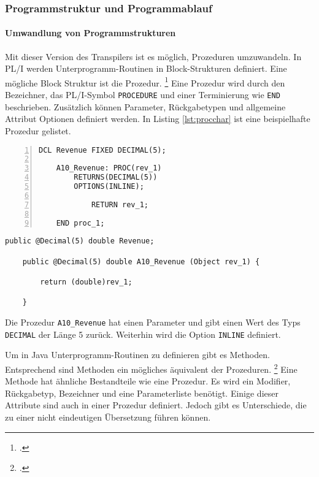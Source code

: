 \pagebreak
\subsubsection{Programmstruktur und Programmablauf}
\paragraph{Umwandlung von Programmstrukturen }\label{programstruct}

Mit dieser Version des Transpilers ist es möglich, Prozeduren umzuwandeln.
In PL/I werden Unterprogramm-Routinen in Block-Strukturen definiert. Eine mögliche Block Struktur ist die Prozedur. \footcite[Vgl. ][S. 97ff. ]{pliref}
Eine Prozedur wird durch den Bezeichner, das PL/I-Symbol \verb+PROCEDURE+ und einer Terminierung wie \verb+END+ beschrieben.
Zusätzlich können Parameter, Rückgabetypen und allgemeine Attribut Optionen definiert werden. In Listing \ref{lst:procchar} ist eine beispielhafte Prozedur gelistet.

\begin{minipage}[b]{0.48\linewidth}
	\centering
	\lstset{language=PL/I,label=SliceExaple}
	\begin{lstlisting}[frame=single, numbers=left, mathescape,%
		caption={Prozeduren}, label={lst:procchar}]
	DCL Revenue FIXED DECIMAL(5);

	A10_Revenue: PROC(rev_1) 
		RETURNS(DECIMAL(5)) 
		OPTIONS(INLINE);
			
			RETURN rev_1;
	
	END proc_1;
	\end{lstlisting}
\end{minipage}
\hspace{0.5cm}
\begin{minipage}[b]{0.48\linewidth}
	\centering
	\lstset{language=Java,label=SliceExaple}
	\begin{lstlisting}[frame=single, mathescape,%
		title={" "}]
	public @Decimal(5) double Revenue;
		
	public @Decimal(5) double A10_Revenue (Object rev_1) { 
		
		return (double)rev_1;
	
	}
	\end{lstlisting}
\end{minipage}

Die Prozedur \verb+A10_Revenue+ hat einen Parameter und gibt einen Wert des Typs \verb+DECIMAL+ der L\"ange 5 zur\"uck.
Weiterhin wird die Option \verb+INLINE+ definiert.

Um in Java Unterprogramm-Routinen zu definieren gibt es Methoden. 
Entsprechend sind Methoden ein mögliches äquivalent der Prozeduren. \footcite[Vgl. ][]{oracle}
Eine Methode hat ähnliche Bestandteile wie eine Prozedur.
Es wird ein Modifier, Rückgabetyp, Bezeichner und eine Parameterliste benötigt.
Einige dieser Attribute sind auch in einer Prozedur definiert.
Jedoch gibt es Unterschiede, die zu einer nicht eindeutigen Übersetzung führen können.

